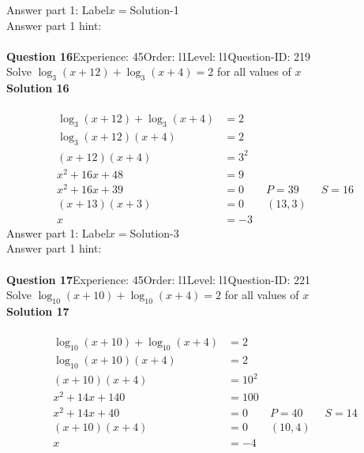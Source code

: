 \documentclass{article}
\begin{document}
Answer part 1: \hspace{10pt}Label\hspace{10pt}$x=$\hspace{10pt}Solution\hspace{10pt}-1\\
Answer part 1 hint: \hspace{15pt}\\
\\[4pt]
\noindent\textbf{Question 16}\hspace{20pt}Experience: 45\hspace{20pt}Order: l1\hspace{20pt}Level: l1\hspace{20pt}Question-ID: 219\\[2pt]
Solve $\log_{3}(x+12)+\log_{3}(x+4)=2$ for all values of $x$\\[4pt]
\noindent\textbf{Solution 16}\\[2pt]
\\[-35pt]\begin{align*}
\log_{3}(x+12)+\log_{3}(x+4)&=2\\[2pt]
\log_{3}(x+12)(x+4)&=2\\[2pt]
(x+12)(x+4)&=3^2\\[2pt]
x^2+16x+48&=9\\[2pt]
x^2+16x+39&=0\qquad P=39 \qquad S=16\\[2pt]
(x+13)(x+3)&=0\qquad (13,3)\\[2pt]
x&=-3
\end{align*}
Answer part 1: \hspace{10pt}Label\hspace{10pt}$x=$\hspace{10pt}Solution\hspace{10pt}-3\\
Answer part 1 hint: \hspace{15pt} \\
\\[4pt]
\noindent\textbf{Question 17}\hspace{20pt}Experience: 45\hspace{20pt}Order: l1\hspace{20pt}Level: l1\hspace{20pt}Question-ID: 221\\[2pt]
Solve $\log_{10}(x+10)+\log_{10}(x+4)=2$ for all values of $x$\\[4pt]
\noindent\textbf{Solution 17}\\[2pt]
\\[-35pt]\begin{align*}
\log_{10}(x+10)+\log_{10}(x+4)&=2\\[2pt]
\log_{10}(x+10)(x+4)&=2\\[2pt]
(x+10)(x+4)&=10^2\\[2pt]
x^2+14x+140&=100\\[2pt]
x^2+14x+40&=0\qquad P=40 \qquad S=14\\[2pt]
(x+10)(x+4)&=0\qquad (10,4)\\[2pt]
x&=-4
\end{align*}
\end{document}
